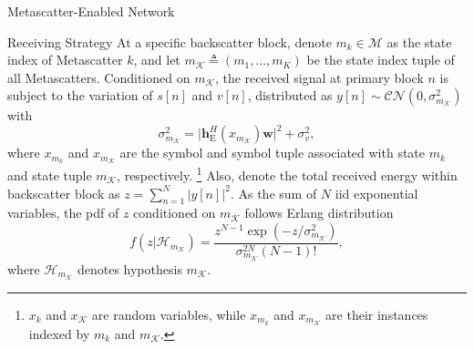 \documentclass[journal]{IEEEtran}
\begin{document}
\begin{section}{Metascatter-Enabled Network}
\begin{subsection}{Receiving Strategy}
		At a specific backscatter block, denote $m_k \in \mathcal{M}$ as the state index of Metascatter $k$, and let $m_{\mathcal{K}} \triangleq (m_1,\ldots,m_K)$ be the state index tuple of all Metascatters.
		Conditioned on $m_{\mathcal{K}}$, the received signal at primary block $n$ is subject to the variation of $s[n]$ and $v[n]$, distributed as $y[n] \sim \mathcal{CN}(0,\sigma_{m_{\mathcal{K}}}^2)$ with
		\begin{equation}
			\sigma_{m_{\mathcal{K}}}^2 = \lvert \boldsymbol{h}_{\mathrm{E}}^H(x_{m_{\mathcal{K}}}) \boldsymbol{w} \rvert^2 + \sigma_v^2,
			\label{eq:receive_variance}
		\end{equation}
		where $x_{m_k}$ and $x_{m_\mathcal{K}}$ are the symbol and symbol tuple associated with state $m_k$ and state tuple $m_{\mathcal{K}}$, respectively.%
		\footnote{
			$x_k$ and $x_{\mathcal{K}}$ are random variables, while $x_{m_k}$ and $x_{m_{\mathcal{K}}}$ are their instances indexed by $m_k$ and $m_{\mathcal{K}}$.
		}
		Also, denote the total received energy within backscatter block as $z=\sum_{n=1}^N \lvert y[n] \rvert^2$.
		As the sum of $N$ \gls{iid} exponential variables, the \gls{pdf} of $z$ conditioned on $m_{\mathcal{K}}$ follows Erlang distribution
		\begin{equation}
			f(z|\mathcal{H}_{m_{\mathcal{K}}}) = \frac{z^{N-1} \exp(-z/\sigma_{m_{\mathcal{K}}}^2)}{\sigma_{m_{\mathcal{K}}}^{2N} (N-1)!},
			\label{eq:energy_distribution}
		\end{equation}
		where $\mathcal{H}_{m_{\mathcal{K}}}$ denotes hypothesis $m_{\mathcal{K}}$.

\end{subsection}
\end{section}
\end{document}
